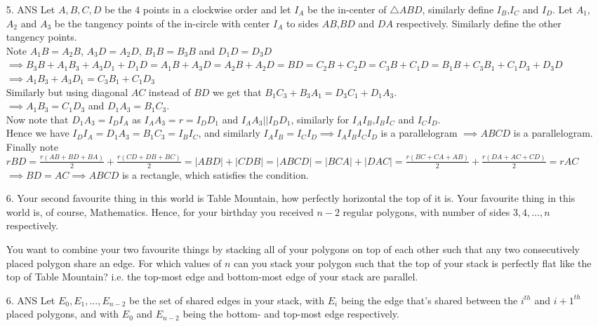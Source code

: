 \documentclass{article}
\begin{document}
\begin{enumerate}
\item[5. ANS]
Let $A,B,C,D$ be the $4$ points in a clockwise order and let $I_A$ be the in-center of $\triangle ABD$, similarly define $I_B$,$I_C$ and $I_D$. Let $A_1$,$A_2$ and $A_3$ be the tangency points of the in-circle with center $I_A$ to sides $AB$,$BD$ and $DA$ respectively. Similarly define the other tangency points. 
\\Note $A_1B = A_2B$, $A_3D = A_2D$, $B_1B = B_3B$ and $D_1D = D_3D$
\\$\implies B_3B+A_1B_3+A_3D_1+D_1D = A_1B+A_3D = A_2B+A_2D = BD = C_2B+C_2D = C_3B+C_1D = B_1B+C_3B_1+C_1D_3+D_3D$
\\$\implies A_1B_3 + A_3D_1 = C_3B_1+C_1D_3$
\\Similarly but using diagonal $AC$ instead of $BD$ we get that $B_1C_3 + B_3A_1  = D_3C_1 + D_1A_3$.
\\$\implies A_1B_3 = C_1D_3$ and $D_1A_3 = B_1C_3$. 
\\Now note that $D_1A_3 = I_DI_A$ as $I_AA_3 = r = I_DD_1$ and $I_AA_3||I_DD_1$, similarly for $I_AI_B$,$I_BI_C$ and $I_CI_D$.
\\Hence we have $I_DI_A=D_1A_3=B_1C_3=I_BI_C$, and similarly $I_AI_B=I_CI_D \implies I_AI_BI_CI_D$ is a parallelogram $\implies ABCD$ is a parallelogram. 
\\Finally note $rBD = \frac{r(AB+BD+BA)}{2} + \frac{r(CD+DB+BC)}{2} = |ABD|+|CDB| = |ABCD| = |BCA|+|DAC| = \frac{r(BC+CA+AB)}{2} + \frac{r(DA+AC+CD)}{2} = rAC$
\\$\implies BD=AC \implies ABCD$ is a rectangle, which satisfies the condition.


\medskip
\item[6.] %
Your second favourite thing in this world is Table Mountain, how perfectly horizontal the top of it is.
Your favourite thing in this world is, of course, Mathematics.
Hence, for your birthday you received $n-2$ regular polygons, with number of sides $3, 4, \dotsc, n$ respectively.

You want to combine your two favourite things by stacking all of your polygons on top of each other such that any two consecutively placed polygon share an edge.
For which values of $n$ can you stack your polygon such that the top of your stack is perfectly flat like the top of Table Mountain?
i.e. the top-most edge and bottom-most edge of your stack are parallel.

\item[6. ANS] %
Let $E_0,E_1,...,E_{n-2}$ be the set of shared edges in your stack, with $E_i$ being the edge that's shared between the $i^{th}$ and $i+1^{th}$ placed polygons, and with $E_0$ and $E_{n-2}$ being the bottom- and top-most edge respectively.


\end{enumerate}
\end{document}

